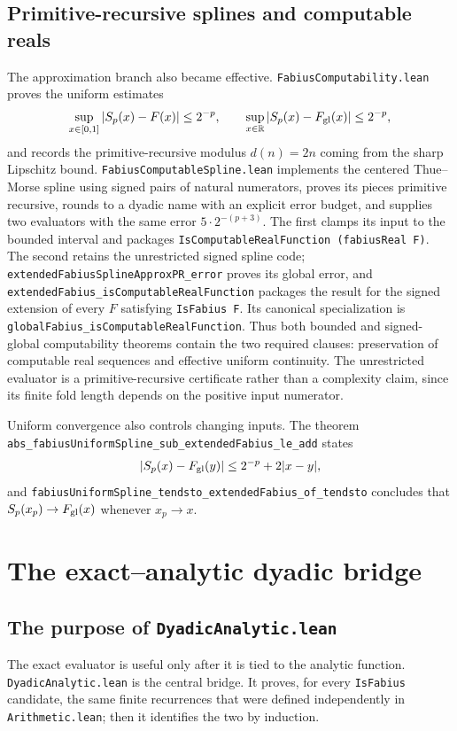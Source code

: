\documentclass[11pt,oneside]{article}
\theoremstyle{definition}
\theoremstyle{remark}
\begin{document}
\subsection{Primitive-recursive splines and computable reals}
The approximation branch also became effective.  \nolinkurl{FabiusComputability.lean}
proves the uniform estimates
\[
  \sup_{x\in[0,1]}|S_p(x)-F(x)|\leq2^{-p},\qquad
  \sup_{x\in\mathbb{R}}|S_p(x)-F_{\mathrm{gl}}(x)|\leq2^{-p},
\]
and records the primitive-recursive modulus \(d(n)=2n\) coming from the sharp
Lipschitz bound.  \nolinkurl{FabiusComputableSpline.lean} implements the centered
Thue--Morse spline using signed pairs of natural numerators, proves its pieces
primitive recursive, rounds to a dyadic name with an explicit error budget,
and supplies two evaluators with the same error \(5\cdot2^{-(p+3)}\).  The
first clamps its input to the bounded interval and packages
\nolinkurl{IsComputableRealFunction (fabiusReal F)}.  The second retains the
unrestricted signed spline code; \nolinkurl{extendedFabiusSplineApproxPR_error}
proves its global error, and
\nolinkurl{extendedFabius_isComputableRealFunction} packages the result for
the signed extension of every \(F\) satisfying \nolinkurl{IsFabius F}.  Its canonical specialization is
\nolinkurl{globalFabius_isComputableRealFunction}.  Thus both bounded and
signed-global computability theorems contain the two required clauses:
preservation of computable real sequences and effective uniform continuity.
The unrestricted evaluator is a primitive-recursive certificate rather than a
complexity claim, since its finite fold length depends on the positive input
numerator.

Uniform convergence also controls changing inputs.  The theorem
\nolinkurl{abs_fabiusUniformSpline_sub_extendedFabius_le_add} states
\[
  |S_p(x)-F_{\mathrm{gl}}(y)|\leq 2^{-p}+2|x-y|,
\]
and \nolinkurl{fabiusUniformSpline_tendsto_extendedFabius_of_tendsto} concludes
that \(S_p(x_p)\to F_{\mathrm{gl}}(x)\) whenever \(x_p\to x\).

\section{The exact--analytic dyadic bridge}\label{ch:dyadic-bridge}

\subsection{The purpose of \texttt{DyadicAnalytic.lean}}
The exact evaluator is useful only after it is tied to the analytic function.  \nolinkurl{DyadicAnalytic.lean} is the central bridge.  It proves, for every \nolinkurl{IsFabius} candidate, the same finite recurrences that were defined independently in \nolinkurl{Arithmetic.lean}; then it identifies the two by induction.
\end{document}
